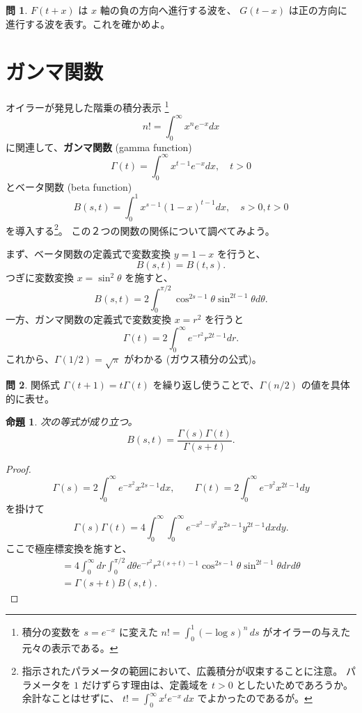 \documentclass[a4paper]{jsarticle}
\newtheorem{Proposition}[Theorem]{命題}
\theoremstyle{definition}
\newtheorem{Exercise}{問}%
\theoremstyle{remark}
\begin{document}
\begin{Exercise}
$F(t+x)$ は $x$ 軸の負の方向へ進行する波を、
$G(t-x)$ は正の方向に進行する波を表す。これを確かめよ。
\end{Exercise}




\section{ガンマ関数}
オイラーが発見した階乗の積分表示
\footnote{
積分の変数を $s = e^{-x}$ に変えた
$\displaystyle 
n! = \int_0^1(-\log s)^n\, ds
$
がオイラーの与えた元々の表示である。
}
\[
n! = \int_0^{\infty} x^n e^{-x} dx
\]
に関連して、\textbf{ガンマ関数} (gamma function)
\[
\Gamma(t) = \int_0^{\infty} x^{t-1} e^{-x} dx, \quad t>0
\]
とベータ関数 (beta function) 
\[
B(s,t) = \int_0^1 x^{s-1}(1-x)^{t-1} dx, \quad s>0, t>0
\]
を導入する\footnote{
指示されたパラメータの範囲において、広義積分が収束することに注意。
パラメータを $1$ だけずらす理由は、定義域を $t>0$ としたいためであろうか。余計なことはせずに、
$\displaystyle t! = \int_0^\infty x^t e^{-x}\, dx$ でよかったのであるが。
}。
この２つの関数の関係について調べてみよう。

まず、ベータ関数の定義式で変数変換 $y = 1-x$ を行うと、
\[
B(s,t) = B(t,s).
\]
つぎに変数変換 $x = \sin^2 \theta$ を施すと、
\[
B(s,t) = 2\int_0^{\pi/2} \cos^{2s-1}\theta \sin^{2t-1}\theta d\theta.
\]
一方、ガンマ関数の定義式で変数変換 $x = r^2$ を行うと
\[
\Gamma(t) = 2\int_0^{\infty} e^{-r^2} r^{2t-1} dr. 
\]
これから、$\Gamma(1/2) = \sqrt{\pi}$ がわかる (ガウス積分の公式)。

\begin{Exercise}
関係式 $\Gamma(t+1) = t\Gamma(t)$ を繰り返し使うことで、$\Gamma(n/2)$ の値を具体的に表せ。
\end{Exercise}

\begin{Proposition}
次の等式が成り立つ。
\[
B(s,t) = \frac{\Gamma(s)\Gamma(t)}{\Gamma(s+t)}. 
\]
\end{Proposition}

\begin{proof}
\[
\Gamma(s) = 2\int_0^{\infty} e^{-x^2} x^{2s-1}dx, 
\qquad 
\Gamma(t) = 2\int_0^{\infty} e^{-y^2} x^{2t-1}dy
\]
を掛けて
\[
\Gamma(s)\Gamma(t) = 4 \int_0^{\infty}\int_0^{\infty} 
e^{-x^2-y^2} x^{2s-1}y^{2t-1}dxdy.
\]
ここで極座標変換を施すと、
\begin{gather*}
= 4 \int_0^{\infty}dr \int_0^{\pi/2} d\theta 
e^{-r^2} r^{2(s+t)-1} \cos^{2s-1}\theta \sin^{2t-1}\theta dr d\theta\\
= \Gamma(s+t) B(s,t).
\end{gather*}
\end{proof}
\end{document}
